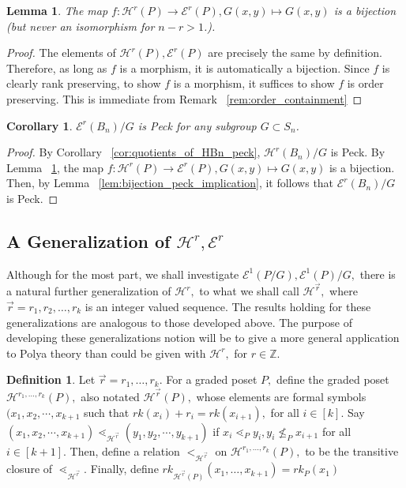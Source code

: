 \documentclass[10 pt]{amsart}
\theoremstyle{plain}
\newtheorem{lem}[thm]{Lemma}
\newtheorem{cor}[thm]{Corollary}
\theoremstyle{definition}
\newtheorem{defn}[thm]{Definition}
\theoremstyle{remark}
\numberwithin{equation}{section}
\newcommand\BBZ{{\mathbb Z}}
\renewcommand{\vec}[1]{\overrightarrow{#1}}
\begin{document}
\begin{lem}
\label{bijection_h_f}
The map $f:\mathcal H^r(P) \rightarrow \mathcal E^r(P),G(x, y) \mapsto G(x, y)$ is a bijection (but never an isomorphism for $n-r > 1$.).
\end{lem}
\begin{proof}
The elements of $\mathcal H^r(P),\mathcal E^r(P)$ are precisely the same by definition. Therefore, as long as $f$ is a morphism, it is automatically a bijection. Since $f$ is clearly rank preserving, to show $f$ is a morphism, it suffices to show $f$ is order preserving. This is immediate from Remark ~\ref{rem:order_containment}
\end{proof}

\begin{cor}
\label{cor:quotiented_edge_peck}
$\mathcal E^r(B_n)/G$ is Peck for any subgroup $G\subset S_n$.
\end{cor}
\begin{proof}
By Corollary ~\ref{cor:quotients_of_HBn_peck}, $\mathcal H^r(B_n)/G$ is Peck. By Lemma ~\ref{bijection_h_f}, the map $f:\mathcal H^r(P) \rightarrow \mathcal E^r(P),G(x, y) \mapsto G(x, y)$ is a bijection. Then, by Lemma ~\ref{lem:bijection_peck_implication}, it follows that $\mathcal E^r(B_n)/G$ is Peck.
\end{proof}

\subsection{A Generalization of $\mathcal H^r,\mathcal E^r$}
Although for the most part, we shall investigate $\mathcal E^1(P/G),\mathcal E^1(P)/G,$ there is a natural further generalization of $\mathcal H^r,$ to what we shall call $\mathcal H^{\vec r},$ where $\vec r = r_1,r_2,\ldots, r_k$ is an integer valued sequence. The results holding for these generalizations are analogous to those developed above. The purpose of developing these generalizations notion will be to give a more general application to Polya theory than could be given with $\mathcal H^r,$ for $r \in \BBZ$.

\begin{defn}
Let $\vec r = r_1,\ldots,r_k.$ For a graded poset $P,$ define the graded poset $\mathcal H^{r_1,\ldots, r_k}(P),$ also notated $\mathcal H^{\vec r}(P),$ whose elements are formal symbols $(x_1, x_2, \cdots, x_{k+1}$ such that $rk(x_i)+r_i = rk(x_{i+1}),$ for all $i \in [k].$ Say $(x_1, x_2, \cdots, x_{k+1})\lessdot_{\mathcal H^{\vec r}} (y_1, y_2, \cdots, y_{k+1})$ if $x_i \lessdot_P y_i,y_{i} \not \leq_P x_{i+1}$ for all $i \in [k+1].$ Then, define a relation $<_{\mathcal H^{\vec r}}$ on $\mathcal H^{r_1,\ldots, r_k}(P),$ to be the transitive closure of $\lessdot_{\mathcal H^{\vec r}}.$ Finally, define $rk_{\mathcal H^{\vec r}(P)}(x_1,\ldots, x_{k+1}) = rk_P(x_1)$
\end{defn}
\end{document}
